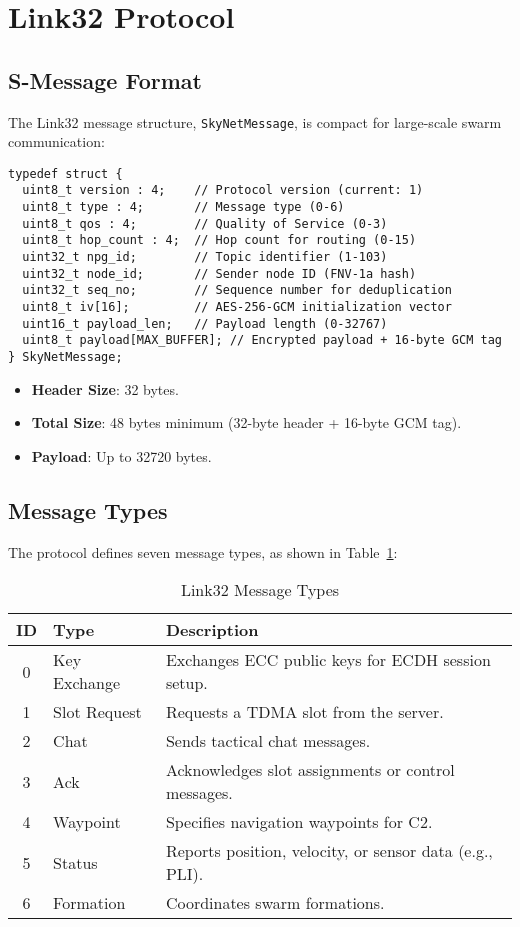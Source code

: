 \documentclass{article}
\begin{document}
\section{Link32 Protocol}

\subsection{S-Message Format}
The Link32 message structure, \texttt{SkyNetMessage}, is compact for large-scale swarm
communication:
\begin{lstlisting}
typedef struct {
  uint8_t version : 4;    // Protocol version (current: 1)
  uint8_t type : 4;       // Message type (0-6)
  uint8_t qos : 4;        // Quality of Service (0-3)
  uint8_t hop_count : 4;  // Hop count for routing (0-15)
  uint32_t npg_id;        // Topic identifier (1-103)
  uint32_t node_id;       // Sender node ID (FNV-1a hash)
  uint32_t seq_no;        // Sequence number for deduplication
  uint8_t iv[16];         // AES-256-GCM initialization vector
  uint16_t payload_len;   // Payload length (0-32767)
  uint8_t payload[MAX_BUFFER]; // Encrypted payload + 16-byte GCM tag
} SkyNetMessage;
\end{lstlisting}
\begin{itemize}
    \item \textbf{Header Size}: 32 bytes.
    \item \textbf{Total Size}: 48 bytes minimum (32-byte header + 16-byte GCM tag).
    \item \textbf{Payload}: Up to 32720 bytes.
\end{itemize}

\subsection{Message Types}
The protocol defines seven message types, as shown in Table~\ref{tab:msgtypes}:
\begin{table}[h]
\centering
\caption{Link32 Message Types}
\label{tab:msgtypes}
\begin{tabular}{clp{7cm}}
\hline
\textbf{ID} & \textbf{Type} & \textbf{Description} \\
\hline
0 & Key Exchange & Exchanges ECC public keys for ECDH session setup. \\
1 & Slot Request & Requests a TDMA slot from the server. \\
2 & Chat & Sends tactical chat messages. \\
3 & Ack & Acknowledges slot assignments or control messages. \\
4 & Waypoint & Specifies navigation waypoints for C2. \\
5 & Status & Reports position, velocity, or sensor data (e.g., PLI). \\
6 & Formation & Coordinates swarm formations. \\
\hline
\end{tabular}
\end{table}
\end{document}
